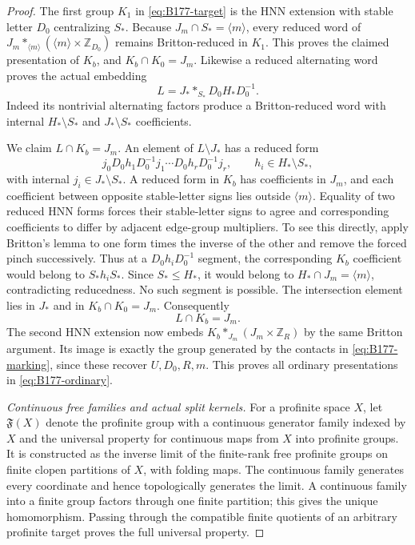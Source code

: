\begin{proof}
The first group \(K_1\) in \eqref{eq:B177-target} is the HNN
extension with stable letter \(D_0\) centralizing \(S_*\).
Because \(J_m\cap S_*=\langle m\rangle\), every reduced word of
\(J_m*_{\langle m\rangle}
(\langle m\rangle\times\mathbb Z_{D_0})\) remains Britton-reduced
in \(K_1\). This proves the claimed presentation of \(K_b\),
and \(K_b\cap K_0=J_m\).
Likewise a reduced alternating word proves the actual embedding
\begin{equation}\label{eq:B177-Lamalgam}
                L=J_* *_{S_*}D_0H_*D_0^{-1}.
\end{equation}
Indeed its nontrivial alternating factors produce a Britton-reduced
word with internal \(H_*\setminus S_*\) and
\(J_*\setminus S_*\) coefficients.

We claim \(L\cap K_b=J_m\). An element of \(L\setminus J_*\)
has a reduced form
\[
 j_0D_0h_1D_0^{-1}j_1\cdots D_0h_rD_0^{-1}j_r,
 \qquad h_i\in H_*\setminus S_*,
\]
with internal \(j_i\in J_*\setminus S_*\).
A reduced form in \(K_b\) has coefficients in \(J_m\), and each
coefficient between opposite stable-letter signs lies outside
\(\langle m\rangle\). Equality of two reduced HNN forms forces
their stable-letter signs to agree and corresponding coefficients
to differ by adjacent edge-group multipliers. To see this directly,
apply Britton's lemma to one form times the inverse of the other and
remove the forced pinch successively. Thus at a
\(D_0h_iD_0^{-1}\) segment, the corresponding \(K_b\) coefficient
would belong to \(S_*h_iS_*\). Since \(S_*\le H_*\), it would
belong to \(H_*\cap J_m=\langle m\rangle\), contradicting
reducedness. No such segment is possible. The intersection element
lies in \(J_*\) and in \(K_b\cap K_0=J_m\). Consequently
\begin{equation}\label{eq:B177-LKb-ordinary}
                           L\cap K_b=J_m.
\end{equation}
The second HNN extension now embeds
\(K_b*_{J_m}(J_m\times\mathbb Z_R)\) by the same Britton
argument. Its image is exactly the group generated by the contacts
in \eqref{eq:B177-marking}, since these recover \(U,D_0,R,m\).
This proves all ordinary presentations in \eqref{eq:B177-ordinary}.

\emph{Continuous free families and actual split kernels.}
For a profinite space \(X\), let \(\mathfrak F(X)\) denote the
profinite group with a continuous generator family indexed by \(X\)
and the universal property for continuous maps from \(X\) into
profinite groups. It is constructed as the inverse limit of the
finite-rank free profinite groups on finite clopen partitions of
\(X\), with folding maps. The continuous family generates every
coordinate and hence topologically generates the limit. A continuous
family into a finite group factors through one finite partition;
this gives the unique homomorphism. Passing through the compatible
finite quotients of an arbitrary profinite target proves the full
universal property.


\end{proof}
